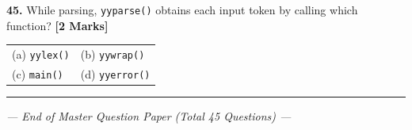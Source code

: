 \documentclass[11pt,a4paper]{article}
\begin{document}
\vspace{0.22cm}

\noindent \textbf{45.} While parsing, \texttt{yyparse()} obtains each input token by calling which function? \hfill \textbf{[2 Marks]}
\vspace{0.06cm}
\noindent
\begin{tabularx}{\textwidth}{@{}X X@{}}
(a) \texttt{yylex()} & (b) \texttt{yywrap()} \\[3pt]
(c) \texttt{main()} & (d) \texttt{yyerror()} \\
\end{tabularx}

\vspace{0.3cm}
\noindent\rule{\textwidth}{0.6pt}
\vspace{0.2cm}
\begin{center}
\textit{--- End of Master Question Paper (Total 45 Questions) ---}
\end{center}
\end{document}
